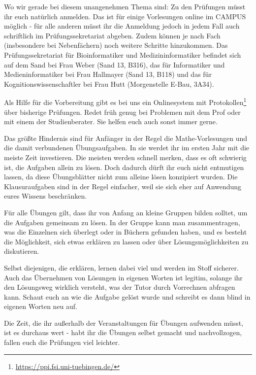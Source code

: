 Wo wir gerade bei diesem unangenehmen Thema sind: Zu den Prüfungen
  müsst ihr euch natürlich anmelden. Das ist für einige Vorlesungen online im 
  CAMPUS möglich - für alle anderen müsst ihr die Anmeldung jedoch in jedem 
  Fall auch schriftlich im Prüfungssekretariat abgeben. Zudem k\"onnen je
  nach Fach (insbesondere bei Nebenf\"achern) noch weitere Schritte hinzukommen.
  Das Prüfungssekretariat für Bioinformatiker und Medizininformatiker befindet sich auf dem Sand bei
  Frau Weber (Sand 13,  B316), das f\"ur 
  Informatiker und Medieninformatiker bei Frau Hallmayer (Sand 13, B118) und das f\"ur
  Kognitionswissenschaftler bei Frau Hutt (Morgenstelle E-Bau, 3A34).

Als Hilfe für die Vorbereitung gibt es bei uns ein Onlinesystem mit Protokollen\footnote{\url{https://ppi.fsi.uni-tuebingen.de/}} 
  über bisherige Prüfungen. Redet 
  früh genug bei Problemen mit dem Prof oder mit einem der Studienberater. Sie 
  helfen euch auch sonst immer gerne.

Das größte Hindernis sind für Anfänger in der Regel die
  Mathe-Vorlesungen und die damit verbundenen Übungsaufgaben.  In sie
  werdet ihr im ersten Jahr mit die meiste Zeit investieren. Die meisten
  werden schnell merken, dass es oft schwierig ist, die Aufgaben
  allein zu lösen. Doch dadurch dürft ihr euch nicht entmutigen lassen, da 
  diese Übungsblätter nicht zum alleine lösen konzipiert wurden. Die 
  Klausuraufgaben sind in der Regel einfacher, weil sie sich eher auf Anwendung 
  eures Wissens beschränken.

Für alle Übungen gilt, dass ihr von Anfang an kleine Gruppen bilden solltet,
  um die Aufgaben gemeinsam zu lösen.  In der Gruppe kann man zusammentragen,
  was die Einzelnen sich überlegt oder in Büchern gefunden haben,
  und es besteht die Möglichkeit, sich etwas erklären zu lassen
  oder über Lösungsmöglichkeiten zu diskutieren.



Selbst diejenigen, die erklären, lernen dabei viel und werden im Stoff sicherer. 
  Auch das Übernehmen von Lösungen in eigenen Worten ist legitim, solange
  ihr den Lösungsweg wirklich versteht, was der Tutor durch Vorrechnen abfragen 
  kann. Schaut euch an wie die Aufgabe gelöst wurde und schreibt es dann blind 
  in eigenen Worten neu auf.

Die Zeit, die ihr außerhalb der Veranstaltungen für Übungen aufwenden
  müsst, ist es durchaus wert - habt ihr die Übungen selbst gemacht und 
  nachvollzogen, fallen euch die Prüfungen viel leichter.

